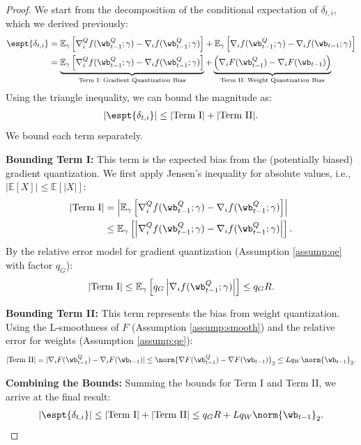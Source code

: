 \documentclass[11pt, letterpaper]{article}
\begin{document}
\begin{proof}
We start from the decomposition of the conditional expectation of $\delta_{t,i}$, which we derived previously:
\begin{align}
\nonumber
    \espt{\delta_{t,i}}&= \mathbb{E}_{\gamma} \left[ \nabla_i^Q f(\wb_{t-1}^Q; \gamma) - \nabla_i f(\wb_{t-1}^Q; \gamma) \right]+\mathbb{E}_{\gamma} \left[ \nabla_i f(\wb_{t-1}^Q; \gamma) - \nabla_i f(\wb_{t-1}; \gamma) \right]\\
    &= \underbrace{\mathbb{E}_{\gamma} \left[ \nabla_i^Q f(\wb_{t-1}^Q; \gamma) - \nabla_i f(\wb_{t-1}^Q; \gamma) \right]}_{\text{Term I: Gradient Quantization Bias}} + \underbrace{\left(\nabla_i F(\wb_{t-1}^Q) - \nabla_i F(\wb_{t-1})\right)}_{\text{Term II: Weight Quantization Bias}}
\end{align}
Using the triangle inequality, we can bound the magnitude as:
\begin{align}
    |\espt{\delta_{t,i}}| \le |\text{Term I}| + |\text{Term II}|.
\end{align}
We bound each term separately.

\textbf{Bounding Term I:}
This term is the expected bias from the (potentially biased) gradient quantization. We first apply Jensen's inequality for absolute values, i.e., $|\mathbb{E}[X]| \le \mathbb{E}[|X|]$:
\begin{align}
    |\text{Term I}| &= \left|\mathbb{E}_{\gamma} \left[ \nabla_i^Q f(\wb_{t-1}^Q; \gamma) - \nabla_i f(\wb_{t-1}^Q; \gamma) \right]\right| \nonumber \\
    &\le \mathbb{E}_{\gamma} \left[ \left|\nabla_i^Q f(\wb_{t-1}^Q; \gamma) - \nabla_i f(\wb_{t-1}^Q; \gamma)\right| \right].
\end{align}
By the relative error model for gradient quantization (Assumption \ref{assump:qe} with factor $q_G$):
\begin{align}
    |\text{Term I}| \le \mathbb{E}_{\gamma} \left[ q_G \left|\nabla_i f(\wb_{t-1}^Q; \gamma)\right| \right] \le q_G R.
\end{align}

\textbf{Bounding Term II:}
This term represents the bias from weight quantization. Using the L-smoothness of $F$ (Assumption \ref{assump:smooth}) and the relative error for weights (Assumption \ref{assump:qe}):
\begin{align}
    |\text{Term II}| = |\nabla_i F(\wb_{t-1}^Q) - \nabla_i F(\wb_{t-1})| \le \norm{\nabla F(\wb_{t-1}^Q) - \nabla F(\wb_{t-1})}_2 \le L q_W \norm{\wb_{t-1}}_2.
\end{align}

\textbf{Combining the Bounds:}
Summing the bounds for Term I and Term II, we arrive at the final result:
\begin{align}
    |\espt{\delta_{t,i}}| \le |\text{Term I}| + |\text{Term II}| \le q_G R  + L q_W \norm{\wb_{t-1}}_2.
\end{align}
\end{proof}
\end{document}
